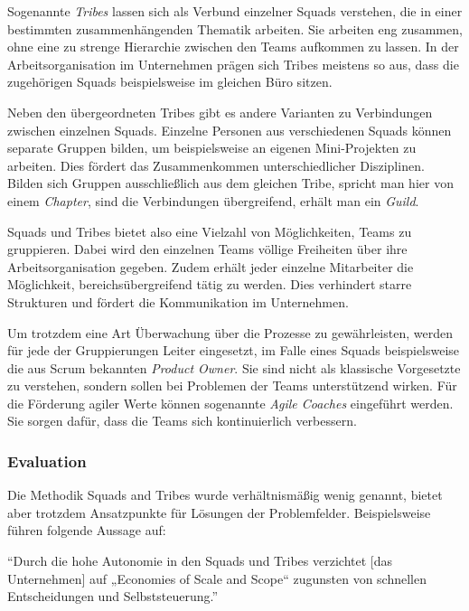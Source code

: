 Sogenannte \textit{Tribes} lassen sich als Verbund einzelner Squads verstehen, die in einer bestimmten zusammenhängenden Thematik arbeiten. Sie arbeiten eng zusammen, ohne eine zu strenge Hierarchie zwischen den Teams aufkommen zu lassen. In der Arbeitsorganisation im Unternehmen prägen sich Tribes meistens so aus, dass die zugehörigen Squads beispielsweise im gleichen Büro sitzen.  \cite[S. 3]{kniberg_scaling_2012}

Neben den übergeordneten Tribes gibt es andere Varianten zu Verbindungen zwischen einzelnen Squads. Einzelne Personen aus verschiedenen Squads können separate Gruppen bilden, um beispielsweise an eigenen Mini-Projekten zu arbeiten. Dies fördert das Zusammenkommen unterschiedlicher Disziplinen. Bilden sich Gruppen ausschließlich aus dem gleichen Tribe, spricht man hier von einem \textit{Chapter}, sind die Verbindungen übergreifend, erhält man ein \textit{Guild}. \cite[S. 9f.]{kniberg_scaling_2012}

Squads und Tribes bietet also eine Vielzahl von Möglichkeiten, Teams zu gruppieren. Dabei wird den einzelnen Teams völlige Freiheiten über ihre Arbeitsorganisation gegeben. Zudem erhält jeder einzelne Mitarbeiter die Möglichkeit, bereichsübergreifend tätig zu werden. Dies verhindert starre Strukturen und fördert die Kommunikation im Unternehmen. 

Um trotzdem eine Art Überwachung über die Prozesse zu gewährleisten, werden für jede der Gruppierungen Leiter eingesetzt, im Falle eines Squads beispielsweise die aus Scrum bekannten \textit{Product Owner}. Sie sind nicht als klassische Vorgesetzte zu verstehen, sondern sollen bei Problemen der Teams unterstützend wirken. Für die Förderung agiler Werte können sogenannte \textit{Agile  Coaches} eingeführt werden. Sie sorgen dafür, dass die Teams sich kontinuierlich verbessern. \cite[S. 4]{kniberg_scaling_2012}

\subsubsection{Evaluation}

Die Methodik Squads and Tribes wurde verhältnismäßig wenig  genannt, bietet aber trotzdem Ansatzpunkte für Lösungen der Problemfelder. Beispielsweise führen  folgende Aussage auf:

\begin{center}
	``Durch die hohe Autonomie in den Squads und Tribes verzichtet [das Unternehmen] auf „Economies of Scale and Scope“ zugunsten von schnellen Entscheidungen und Selbststeuerung.'' \cite[S. 98]{heinemann_digitale_2016}
\end{center}

